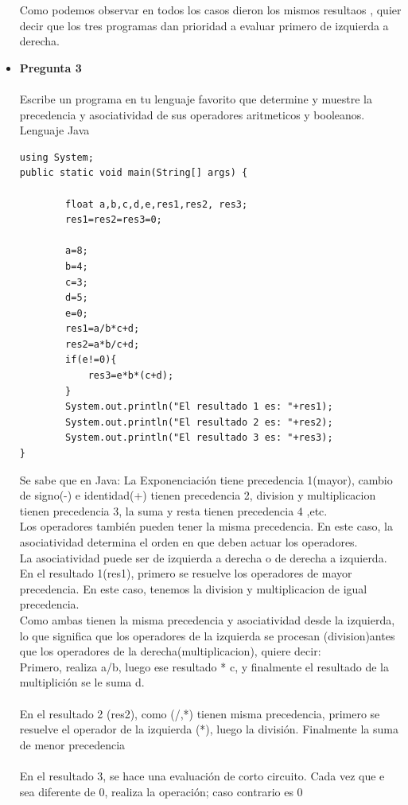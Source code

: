 \documentclass[12pt,oneside]{article}
\begin{document}
\begin{itemize}
Como podemos observar en todos los casos dieron los mismos resultaos , quier decir que los tres programas dan prioridad a evaluar primero de izquierda a derecha.

\item {\bf Pregunta 3} \\\\
Escribe un programa en tu lenguaje favorito que determine y muestre la precedencia y asociatividad de sus operadores aritmeticos y booleanos.\\
Lenguaje Java\\
\begin{lstlisting}[frame=single]  % Start your code-block
using System;
public static void main(String[] args) {
        
        float a,b,c,d,e,res1,res2, res3;
        res1=res2=res3=0;
        
        a=8;
        b=4;
        c=3;
        d=5;
        e=0;
        res1=a/b*c+d;
        res2=a*b/c+d;
        if(e!=0){
            res3=e*b*(c+d);
        }
        System.out.println("El resultado 1 es: "+res1);
        System.out.println("El resultado 2 es: "+res2);
        System.out.println("El resultado 3 es: "+res3);
}

\end{lstlisting}

Se sabe que en Java: La Exponenciación tiene precedencia 1(mayor), cambio de signo(-) e identidad(+) tienen precedencia 2, division y multiplicacion tienen precedencia 3, la suma y resta tienen precedencia 4 ,etc.\\
Los operadores también pueden tener la misma precedencia. En este caso, la asociatividad determina el orden en que deben actuar los operadores. \\
La asociatividad puede ser de izquierda a derecha o de derecha a izquierda.\\
En el resultado 1(res1), primero se resuelve los operadores de mayor precedencia. En este caso, tenemos la division y multiplicacion de igual precedencia.\\
Como ambas tienen la misma precedencia y asociatividad desde la izquierda, lo que significa que los operadores de la izquierda se procesan (division)antes que los operadores de la derecha(multiplicacion), quiere decir:\\
Primero, realiza a/b, luego ese resultado * c, y finalmente el resultado de la multiplición se le suma d. \\\\
En el resultado 2 (res2), como (/,*) tienen misma precedencia, primero se resuelve el operador de la izquierda (*), luego la división. Finalmente la suma de menor precedencia\\\\
En el resultado 3, se hace una evaluación de corto circuito. Cada vez que e sea diferente de 0, realiza la operación; caso contrario es 0\\\\\\


\end{itemize}
\end{document}
